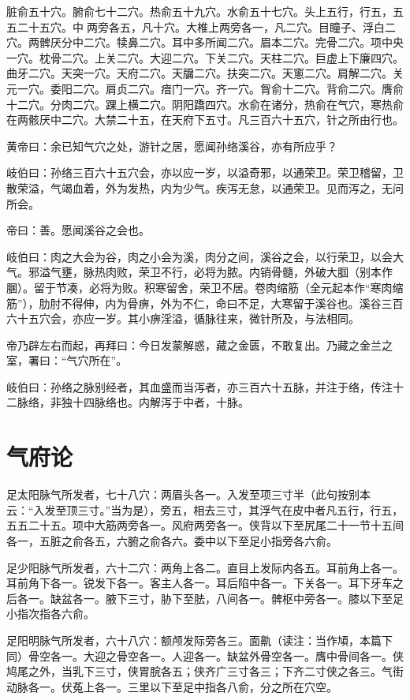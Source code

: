 \documentclass{article}%
\begin{document}
脏俞五十穴。腑俞七十二穴。热俞五十九穴。水俞五十七穴。头上五行，行五，五五二十五穴。中𦛗两旁各五，凡十穴。大椎上两旁各一，凡二穴。目瞳子、浮白二穴。两髀厌分中二穴。犊鼻二穴。耳中多所闻二穴。眉本二穴。完骨二穴。项中央一穴。枕骨二穴。上关二穴。大迎二穴。下关二穴。天柱二穴。巨虚上下廉四穴。曲牙二穴。天突一穴。天府二穴。天牖二穴。扶突二穴。天窻二穴。肩解二穴。关元一穴。委阳二穴。肩贞二穴。瘖门一穴。齐一穴。胷俞十二穴。背俞二穴。膺俞十二穴。分肉二穴。踝上横二穴。阴阳蹻四穴。水俞在诸分，热俞在气穴，寒热俞在两骸厌中二穴。大禁二十五，在天府下五寸。凡三百六十五穴，针之所由行也。

黄帝曰：余已知气穴之处，游针之居，愿闻孙络溪谷，亦有所应乎？

岐伯曰：孙络三百六十五穴会，亦以应一岁，以溢奇邪，以通荣卫。荣卫稽留，卫散荣溢，气竭血着，外为发热，内为少气。疾泻无怠，以通荣卫。见而泻之，无问所会。

帝曰：善。愿闻溪谷之会也。

岐伯曰：肉之大会为谷，肉之小会为溪，肉分之间，溪谷之会，以行荣卫，以会大气。邪溢气壅，脉热肉败，荣卫不行，必将为脓。内销骨髓，外破大腘（别本作䐃）。留于节凑，必将为败。积寒留舍，荣卫不居。卷肉缩筋（全元起本作“寒肉缩筋”），肋肘不得伸，内为骨痹，外为不仁，命曰不足，大寒留于溪谷也。溪谷三百六十五穴会，亦应一岁。其小痹淫溢，循脉往来，微针所及，与法相同。

帝乃辟左右而起，再拜曰：今日发蒙解惑，藏之金匮，不敢复出。乃藏之金兰之室，署曰：“气穴所在”。

岐伯曰：孙络之脉别经者，其血盛而当泻者，亦三百六十五脉，并注于络，传注十二脉络，非独十四脉络也。内解泻于中者，十脉。
\section{气府论}
足太阳脉气所发者，七十八穴：两眉头各一。入发至项三寸半（此句按别本云：“入发至顶三寸。”当为是），旁五，相去三寸，其浮气在皮中者凡五行，行五，五五二十五。项中大筋两旁各一。风府两旁各一。侠背以下至尻尾二十一节十五间各一，五脏之俞各五，六腑之俞各六。委中以下至足小指旁各六俞。

足少阳脉气所发者，六十二穴：两角上各二。直目上发际内各五。耳前角上各一。耳前角下各一。锐发下各一。客主人各一。耳后陷中各一。下关各一。耳下牙车之后各一。缺盆各一。腋下三寸，胁下至胠，八间各一。髀枢中旁各一。膝以下至足小指次指各六俞。

足阳明脉气所发者，六十八穴：额颅发际旁各三。面鼽（读注：当作頄，本篇下同）骨空各一。大迎之骨空各一。人迎各一。缺盆外骨空各一。膺中骨间各一。侠鸠尾之外，当乳下三寸，侠胃脘各五；侠齐广三寸各三；下齐二寸侠之各三。气街动脉各一。伏菟上各一。三里以下至足中指各八俞，分之所在穴空。
\end{document}
